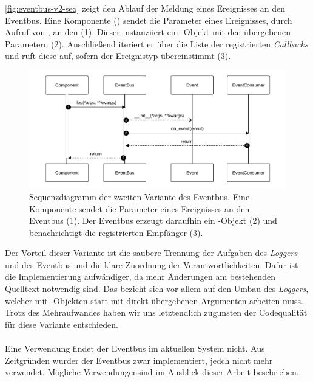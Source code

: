 \autoref{fig:eventbus-v2-seq} zeigt den Ablauf der Meldung eines Ereignisses an den Eventbus. Eine Komponente () sendet die Parameter eines Ereignisses, durch Aufruf von , an den  (1). Dieser instanziiert ein -Objekt mit den übergebenen Parametern (2). Anschließend iteriert er über die Liste der registrierten \emph{Callbacks} und ruft diese auf, sofern der Ereignistyp übereinstimmt (3).

\begin{figure}[!ht]
	\centering
	\includegraphics[width=1.0\linewidth]{images/diagrams/eventbus-v2-seq.pdf}
	\caption{Sequenzdiagramm der zweiten Variante des Eventbus. Eine Komponente sendet die Parameter eines Ereignisses an den Eventbus (1). Der Eventbus erzeugt daraufhin ein -Objekt (2) und benachrichtigt die registrierten Empfänger (3).}
	\label{fig:eventbus-v2-seq}
\end{figure}

Der Vorteil dieser Variante ist die saubere Trennung der Aufgaben des \emph{Loggers} und des Eventbus und die klare Zuordnung der Verantwortlichkeiten. Dafür ist die Implementierung aufwändiger, da mehr Änderungen am bestehenden Quelltext notwendig sind. Das bezieht sich vor allem auf den Umbau des \emph{Loggers}, welcher mit -Objekten statt mit direkt übergebenen Argumenten arbeiten muss. Trotz des Mehraufwandes haben wir uns letztendlich zugunsten der Codequalität für diese Variante entschieden.\\
\\
Eine Verwendung findet der Eventbus im aktuellen System nicht. Aus Zeitgründen wurder der Eventbus zwar implementiert, jedch nicht mehr verwendet. Mögliche Verwendungensind im Ausblick dieser Arbeit beschrieben.